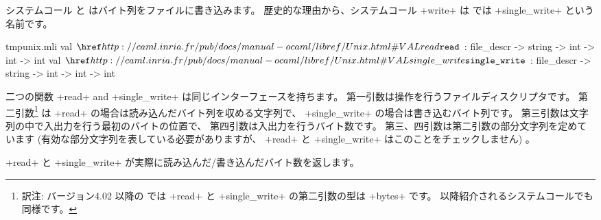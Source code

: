 システムコール  と  はバイト列をファイルに書き込みます。
歴史的な理由から、システムコール \ml+write+ は \ocaml では \ml+single_write+ という名前です。
%
\begin{listingcodefile}{tmpunix.mli}
val $\libvalue{Unix}{read}$ : file_descr -> string -> int -> int -> int
val $\libvalue{Unix}{single\_write}$ : file_descr -> string -> int -> int -> int
\end{listingcodefile}
%
二つの関数 \ml+read+ and \ml+single_write+ は同じインターフェースを持ちます。
第一引数は操作を行うファイルディスクリプタです。
第二引数\footnote{訳注: バージョン4.02 以降の \ocaml では \ml+read+ と \ml+single\_write+ の第二引数の型は \ml+bytes+ です。 以降紹介されるシステムコールでも同様です。} は \ml+read+ の場合は読み込んだバイト列を収める文字列で、
\ml+single_write+ の場合は書き込むバイト列です。
第三引数は文字列の中で入出力を行う最初のバイトの位置で、
第四引数は入出力を行うバイト数です。
第三、四引数は第二引数の部分文字列を定めています
(有効な部分文字列を表している必要がありますが、 \ml+read+ と \ml+single_write+ はこのことをチェックしません) 。
%
\begin{myimage}[width="85\%"]
\end{myimage}
%
\ml+read+ と \ml+single_write+ が実際に読み込んだ/書き込んだバイト数を返します。

